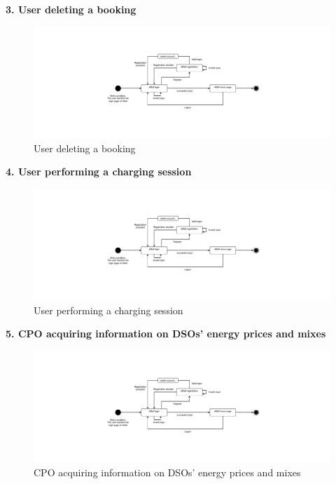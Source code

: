 \documentclass[11pt]{article}
\begin{document}
\begin{description}
    \item \textbf{3. User deleting a booking}
    \begin{figure}[!ht]
        \includegraphics[page={3}, width=\linewidth, trim=7cm 4cm 7cm 4cm, clip]{StateCharts.pdf}
        \caption{User deleting a booking}
    \end{figure}
    
    \newpage
    
    \item \textbf{4. User performing a charging session}
    \begin{figure}[!ht]
        \includegraphics[page={4}, width=\linewidth, trim=2cm 4cm 2cm 4cm, clip]{StateCharts.pdf}
        \caption{User performing a charging session}
    \end{figure}
    
    \item \textbf{5. CPO acquiring information on DSOs' energy prices and mixes}
    \begin{figure}[!ht]
        \includegraphics[page={5}, width=\linewidth, trim=1cm 4cm 1cm 4cm, clip]{StateCharts.pdf}
        \caption{CPO acquiring information on DSOs' energy prices and mixes}
    \end{figure}
    

\end{description}
\end{document}
